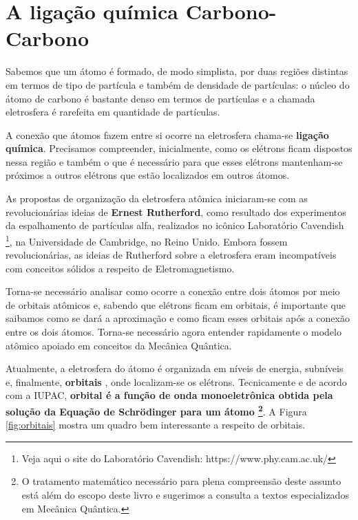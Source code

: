 \chapter{A ligação química Carbono-Carbono}
\begin{mdframed}[backgroundcolor=orange!20,linewidth=0pt,roundcorner=10pt]
	\minitoc
\end{mdframed}
Sabemos que um átomo é formado, de modo simplista, por duas regiões distintas em termos de tipo de partícula e também de densidade de partículas: o núcleo do átomo de carbono é bastante denso em termos de partículas e a chamada eletrosfera é rarefeita em quantidade de partículas.

A conexão que átomos fazem entre si ocorre na eletrosfera chama-se \textbf{ligação química}. Precisamos compreender, inicialmente, como os elétrons ficam dispostos nessa região e também o que é necessário para que esses elétrons mantenham-se próximos a outros elétrons que estão localizados em outros átomos.

As propostas de organização da eletrosfera atômica iniciaram-se com as revolucionárias ideias de \textbf{Ernest Rutherford}, como resultado dos experimentos da espalhamento de partículas alfa, realizados no icônico Laboratório Cavendish \footnote{Veja aqui o site do Laboratório Cavendish: https://www.phy.cam.ac.uk/}, na Universidade de Cambridge, no Reino Unido. Embora fossem revolucionárias, as ideias de Rutherford sobre a eletrosfera eram incompatíveis com conceitos sólidos a respeito de Eletromagnetismo.

Torna-se necessário analisar como ocorre a conexão entre dois átomos por meio de orbitais atômicos e, sabendo que elétrons ficam em orbitais, é importante que saibamos como se dará a aproximação e como ficam esses orbitais após a conexão entre os dois átomos. Torna-se necessário agora entender rapidamente o modelo atômico apoiado em conceitos da Mecânica Quântica.

Atualmente, a eletrosfera do átomo é organizada em níveis de energia, subníveis e, finalmente, \textbf{orbitais} , onde localizam-se os elétrons. Tecnicamente e de acordo com a IUPAC, \textbf{orbital é a função de onda monoeletrônica obtida pela solução da Equação de Schrödinger para um átomo \footnote{O tratamento matemático necessário para plena compreensão deste assunto está além do escopo deste livro e sugerimos a consulta a textos especializados em Mecânica Quântica.}}. A Figura \ref{fig:orbitais} mostra um quadro bem interessante a respeito de orbitais.

